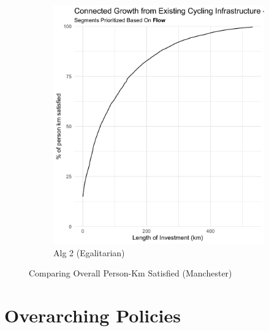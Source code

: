 \documentclass[
]{article}
\begin{document}
\begin{figure} [h!]
\begin{subfigure}{.45\textwidth}
  \includegraphics[width=1\linewidth]{../../data/Manchester/Plots/Growth_Results/growth_community_4_satisfied_km_all_flow_column.png}
  \caption{Alg 2 (Egalitarian)}
  \label{fig:growth_egalitarian_satisfied_all}
\end{subfigure}
\caption{Comparing Overall Person-Km Satisfied (Manchester)}
\label{fig:growth_existing_infra_satisfied}
\end{figure}

\hypertarget{overarching-policies}{%
\section{Overarching Policies}\label{overarching-policies}}
\end{document}
